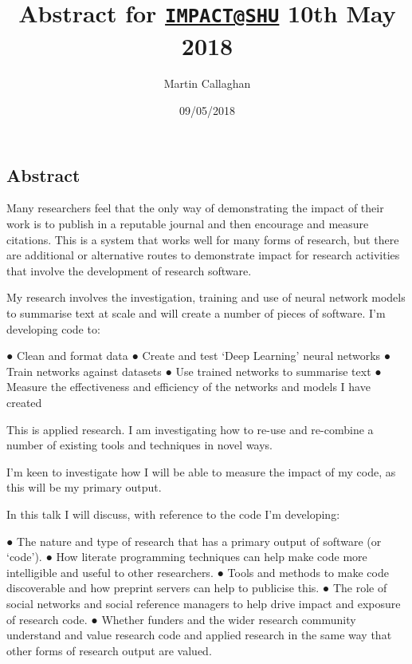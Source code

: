 \documentclass[]{article}
\title{Abstract for \href{mailto:IMPACT@SHU}{\nolinkurl{IMPACT@SHU}} 10th May
2018}
\author{Martin Callaghan}
\date{09/05/2018}
\begin{document}
\maketitle

\subsection{Abstract}\label{abstract}

Many researchers feel that the only way of demonstrating the impact of
their work is to publish in a reputable journal and then encourage and
measure citations. This is a system that works well for many forms of
research, but there are additional or alternative routes to demonstrate
impact for research activities that involve the development of research
software.

My research involves the investigation, training and use of neural
network models to summarise text at scale and will create a number of
pieces of software. I'm developing code to:

● Clean and format data ● Create and test `Deep Learning' neural
networks ● Train networks against datasets ● Use trained networks to
summarise text ● Measure the effectiveness and efficiency of the
networks and models I have created

This is applied research. I am investigating how to re-use and
re-combine a number of existing tools and techniques in novel ways.

I'm keen to investigate how I will be able to measure the impact of my
code, as this will be my primary output.

In this talk I will discuss, with reference to the code I'm developing:

● The nature and type of research that has a primary output of software
(or `code'). ● How literate programming techniques can help make code
more intelligible and useful to other researchers. ● Tools and methods
to make code discoverable and how preprint servers can help to publicise
this. ● The role of social networks and social reference managers to
help drive impact and exposure of research code. ● Whether funders and
the wider research community understand and value research code and
applied research in the same way that other forms of research output are
valued.
\end{document}
